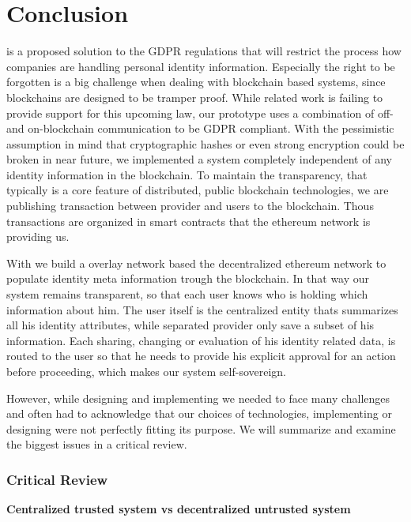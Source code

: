 \chapter{Conclusion}
\label{cha:conclusion}

\projectName{} is a proposed solution to the GDPR regulations that will restrict the process how companies are handling personal identity information. Especially the right to be forgotten is a big challenge when dealing with blockchain based systems, since blockchains are designed to be tramper proof. While related work is failing to provide support for this upcoming law, our prototype uses a combination of off- and on-blockchain communication to be GDPR compliant. With the pessimistic assumption in mind that cryptographic hashes or even strong encryption could be broken in near future, we implemented a system completely independent of any identity information in the blockchain. To maintain the transparency, that typically is a core feature of  distributed, public blockchain technologies, we are publishing transaction between provider and users to the blockchain. Thous transactions are organized in smart contracts that the ethereum network is providing us. 

With \projectName{} we build a overlay network based the decentralized ethereum network to populate identity meta information trough the blockchain. In that way our system remains transparent, so that each user knows who is holding which information about him. The user itself is the centralized entity thats summarizes all his identity attributes, while separated provider only save a subset of his information. Each sharing, changing or evaluation of his identity related data, is routed to the user so that he needs to provide his explicit approval for an action before proceeding, which makes our system self-sovereign.

However, while designing and implementing \projectName{} we needed to face many challenges and often had to acknowledge that our choices of technologies, implementing or designing were not perfectly fitting its purpose. We will summarize and examine the biggest issues in a critical review.

\subsection{Critical Review}
 
\textbf{Centralized trusted system vs decentralized untrusted system}


